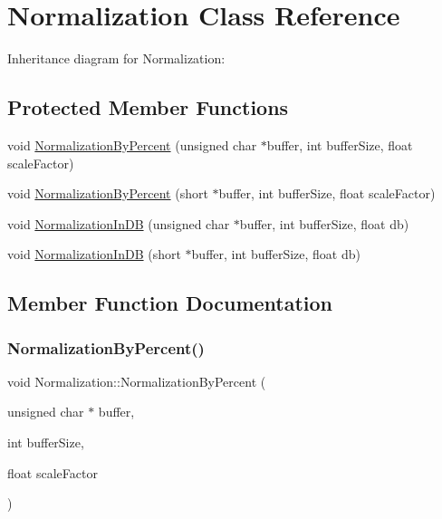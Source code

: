 \hypertarget{classNormalization}{}\section{Normalization Class Reference}
\label{classNormalization}


Inheritance diagram for Normalization\+:
\subsection*{Protected Member Functions}
\begin{DoxyCompactItemize}
\item 
void \hyperlink{classNormalization_a02e3d80b3fa7cc01adc3c61f6de5129d}{Normalization\+By\+Percent} (unsigned char $\ast$buffer, int buffer\+Size, float scale\+Factor)
\item 
void \hyperlink{classNormalization_a430334e17df25fd1f20e4e13afbdab91}{Normalization\+By\+Percent} (short $\ast$buffer, int buffer\+Size, float scale\+Factor)
\item 
void \hyperlink{classNormalization_a14ea077bd0e938357d2a380e219ace20}{Normalization\+In\+DB} (unsigned char $\ast$buffer, int buffer\+Size, float db)
\item 
void \hyperlink{classNormalization_a370489c18a604198120445f01c468d10}{Normalization\+In\+DB} (short $\ast$buffer, int buffer\+Size, float db)
\end{DoxyCompactItemize}


\subsection{Member Function Documentation}
\mbox{\label{classNormalization_a02e3d80b3fa7cc01adc3c61f6de5129d}} 
\subsubsection{\texorpdfstring{Normalization\+By\+Percent()}{NormalizationByPercent()}\hspace{0.1cm}{\footnotesize\ttfamily [1/2]}}
{\footnotesize\ttfamily void Normalization\+::\+Normalization\+By\+Percent (\begin{DoxyParamCaption}\item[{unsigned char $\ast$}]{buffer,  }\item[{int}]{buffer\+Size,  }\item[{float}]{scale\+Factor }\end{DoxyParamCaption})\hspace{0.3cm}{\ttfamily [protected]}}

